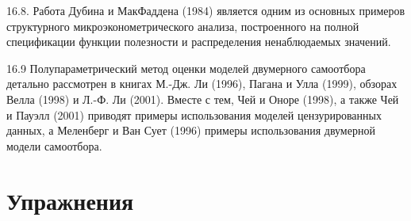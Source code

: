 16.8. Работа Дубина и МакФаддена (1984) является одним из основных примеров структурного микроэконометрического анализа, построенного на полной спецификации функции полезности и распределения ненаблюдаемых значений.

16.9 Полупараметрический метод оценки моделей двумерного самоотбора детально рассмотрен в книгах М.-Дж. Ли (1996), Пагана и Улла (1999), обзорах  Велла (1998) и Л.-Ф. Ли (2001). Вместе с тем, Чей и Оноре (1998), а также Чей и Пауэлл (2001) приводят примеры использования моделей цензурированных данных, а Меленберг и Ван Сует (1996) примеры использования двумерной  модели самоотбора. 


\section{Упражнения}

